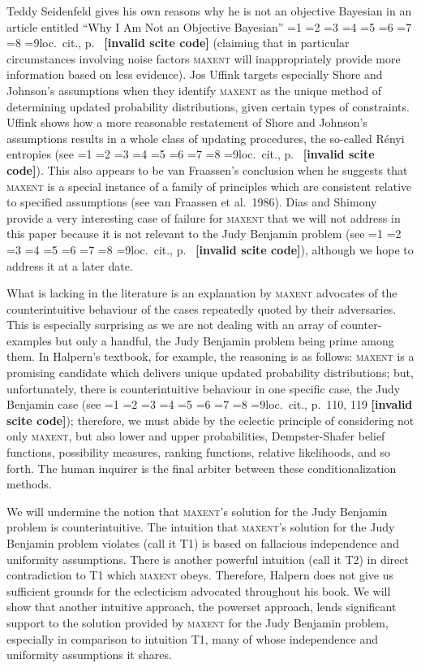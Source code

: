 \documentclass[12pt]{article}
\newcommand{\nonsc}[1]{}
\newcommand{\qeins}[1]{``#1''}
\newif\ifNumericalOrYear
\newcommand{\PageP}{p.~}
\newcommand{\PageP}{}
\newcommand{\scite}[3]{\ifnum#1=1\ifNumericalOrYear\citep{#2}\else\citeyearpar{#2}\fi\else
\ifnum#1=2\ifNumericalOrYear\citep[#3]{#2}\else\citep[{\PageP}#3]{#2}\fi\else
\ifnum#1=3\ifNumericalOrYear(\citet[#3]{#2})\else\citep[{\PageP}#3]{#2}\fi\else
\ifnum#1=4\ifNumericalOrYear\citet{#2}\else\citet{#2}\fi\else
\ifnum#1=5\ifNumericalOrYear(\citet{#2})\else\citep{#2}\fi\else
\ifnum#1=6\ifNumericalOrYear(\citet[#3]{#2})\else\citep[{\PageP}#3]{#2}\fi\else
\ifnum#1=7\ifNumericalOrYear\citep{#2}\else\citealp{#2}\fi\else
\ifnum#1=8\ifNumericalOrYear\citep[#3]{#2}\else\citealp[{\PageP}#3]{#2}\fi\else
\ifnum#1=9\ifNumericalOrYear\citep[#3]{#2}\else{}loc.\ cit., {\PageP}#3\fi\else
\textbf{[invalid scite code]}\fi\fi\fi\fi\fi\fi\fi\fi\fi}
\begin{document}
Teddy Seidenfeld gives his own reasons why he is not an objective
Bayesian in an article entitled \qeins{Why I Am Not an Objective
  Bayesian} \scite{1}{seidenfeld79}{} (claiming that in particular
circumstances involving noise factors \textsc{maxent} will
inappropriately provide more information based on less evidence). Jos
Uffink targets especially Shore and Johnson's assumptions when they
identify \textsc{maxent} as the unique method of determining updated
probability distributions, given certain types of constraints. Uffink
shows how a more reasonable restatement of Shore and Johnson's
assumptions results in a whole class of updating procedures, the
so-called R{\'e}nyi entropies (see \scite{7}{uffink95}{}). This also
appears to be van Fraassen's conclusion when he suggests that
\textsc{maxent} is a special instance of a family of principles which
are consistent relative to specified assumptions (see van Fraassen et
al.\ 1986)\nonsc{}. Dias and Shimony provide a very interesting case of
failure for \textsc{maxent} that we will not address in this paper
because it is not relevant to the Judy Benjamin problem (see
\scite{7}{diasshimony81}{}), although we hope to address it at a later
date.

What is lacking in the literature is an explanation by \textsc{maxent}
advocates of the counterintuitive behaviour of the cases repeatedly
quoted by their adversaries. This is especially surprising as we are
not dealing with an array of counter-examples but only a handful, the
Judy Benjamin problem being prime among them. In Halpern's textbook,
for example, the reasoning is as follows: \textsc{maxent} is a
promising candidate which delivers unique updated probability
distributions; but, unfortunately, there is counterintuitive behaviour
in one specific case, the Judy Benjamin case (see
\scite{8}{halpern03}{110, 119}); therefore, we must abide by the
eclectic principle of considering not only \textsc{maxent}, but also
lower and upper probabilities, Dempster-Shafer belief functions,
possibility measures, ranking functions, relative likelihoods, and so
forth. The human inquirer is the final arbiter between these
conditionalization methods.

We will undermine the notion that \textsc{maxent}'s solution for the
Judy Benjamin problem is counterintuitive. The intuition that
\textsc{maxent}'s solution for the Judy Benjamin problem violates
(call it T1) is based on fallacious independence and uniformity
assumptions. There is another powerful intuition (call it T2) in
direct contradiction to T1 which \textsc{maxent} obeys. Therefore,
Halpern does not give us sufficient grounds for the eclecticism
advocated throughout his book. We will show that another intuitive
approach, the powerset approach, lends significant support to the
solution provided by \textsc{maxent} for the Judy Benjamin problem,
especially in comparison to intuition T1, many of whose independence
and uniformity assumptions it shares.
\end{document}
